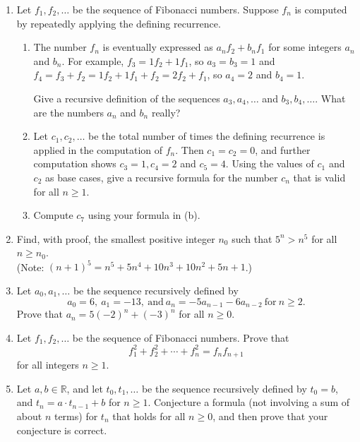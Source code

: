 \documentclass[11 pt]{article}%
\begin{document}
\begin{enumerate}
\item Let $f_1, f_2, \ldots$ be the sequence of Fibonacci numbers.
 Suppose $f_n$ is computed by repeatedly applying the defining recurrence.
 \begin{enumerate}
\item The number $f_n$ is eventually expressed as $a_n f_2 + b_n f_1$ for some integers $a_n$ and $b_n$.  For example, $f_3 = 1f_2 + 1f_1$, so $a_3 = b_3 = 1$ and $f_4 = f_3 + f_2 = 1f_2 + 1f_1 + f_2 = 2f_2 + f_1$, so $a_4 = 2$ and $b_4 = 1$.  

Give a recursive definition of the sequences $a_3, a_4, \ldots$ and $b_3, b_4, \ldots$.
What are the numbers $a_n$ and $b_n$ really?

\item Let $c_1, c_2, \ldots$ be the total number of times the defining recurrence is applied in the computation of $f_n$.  
Then $c_1 = c_2 = 0$, and further computation shows $c_3 = 1, c_4 = 2$ and $c_5 = 4$.  Using the values of $c_1$ and $c_2$ as base cases, give a recursive formula for the number $c_n$ that is valid for all
$n \geq 1$.

\item Compute $c_7$ using your formula in (b).
\end{enumerate}

\item  Find, with proof, the smallest positive integer $n_0$ such that $5^n > n^5$ for all $n \geq n_0$.\\
(Note: $(n+1)^5 = n^5 + 5n^4 + 10n^3 + 10n^2 + 5n + 1$.)

\item  Let $a_0, a_1, \ldots$ be the sequence recursively defined by
$$a_0 = 6,\ a_1 = -13,\ \text{and}\ a_n = -5a_{n-1} -6a_{n-2}\ \text{for}\ n \geq 2.$$  
Prove that $a_n = 5(-2)^n + (-3)^n$ for all $n \geq 0$.

\item Let $f_1, f_2, \ldots$ be the sequence of Fibonacci numbers.  
Prove that $$f_1^2 + f_2^2 + \cdots + f_n^2 = f_{n}f_{n+1}$$ for all integers $n \geq 1$.

\item Let $a, b \in \mathbb{R}$, and let $t_0, t_1, \ldots$ be the sequence recursively defined by
$t_0 = b$, and $t_n = a \cdot t_{n-1} + b$ for $n \geq 1$.  
Conjecture a formula (not involving a sum of about $n$ terms)   for $t_n$ that holds for all $n \geq 0$, and then prove that your conjecture is correct.

\end{enumerate}
\end{document}
